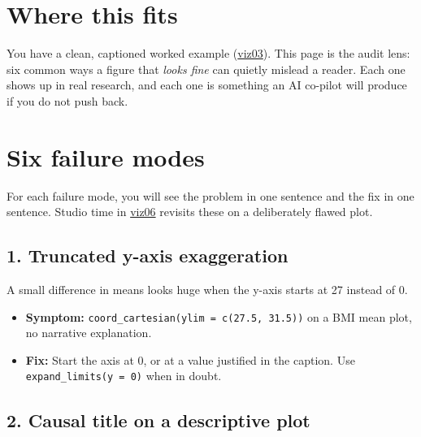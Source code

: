 \documentclass[
  letterpaper,
  DIV=11,
  numbers=noendperiod,
  oneside]{scrreprt}
\providecommand{\tightlist}{%
  \setlength{\itemsep}{0pt}\setlength{\parskip}{0pt}}
\begin{document}

\section*{Where this fits}\label{where-this-fits-2}


You have a clean, captioned worked example
(\hyperref[worked-example-descriptive-bmi-visualization]{viz03}). This
page is the audit lens: six common ways a figure that \emph{looks fine}
can quietly mislead a reader. Each one shows up in real research, and
each one is something an AI co-pilot will produce if you do not push
back.

\section*{Six failure modes}\label{six-failure-modes}


For each failure mode, you will see the problem in one sentence and the
fix in one sentence. Studio time in
\href{viz06-studio-visual-audit.qmd}{viz06} revisits these on a
deliberately flawed plot.

\subsection*{1. Truncated y-axis
exaggeration}\label{truncated-y-axis-exaggeration}

A small difference in means looks huge when the y-axis starts at 27
instead of 0.

\begin{itemize}
\tightlist
\item
  \textbf{Symptom:} \texttt{coord\_cartesian(ylim\ =\ c(27.5,\ 31.5))}
  on a BMI mean plot, no narrative explanation.
\item
  \textbf{Fix:} Start the axis at 0, or at a value justified in the
  caption. Use \texttt{expand\_limits(y\ =\ 0)} when in doubt.
\end{itemize}

\subsection*{2. Causal title on a descriptive
plot}\label{causal-title-on-a-descriptive-plot}
\end{document}
